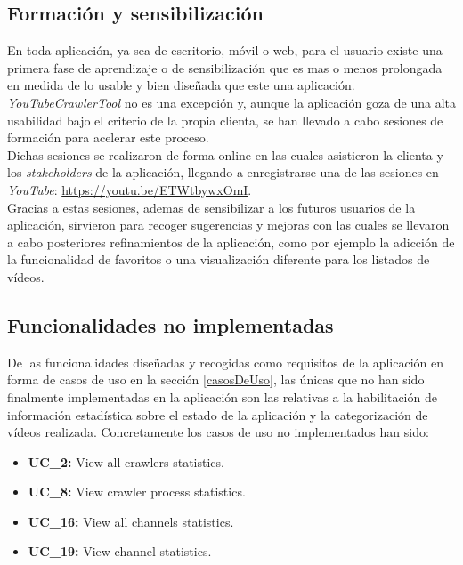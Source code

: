 \documentclass[11pt,a4paper]{article}
\begin{document}
\medskip 

\subsection{Formación y sensibilización}
En toda aplicación, ya sea de escritorio, móvil o web, para el usuario existe una primera fase de aprendizaje o de sensibilización que es mas o menos prolongada en medida de lo usable y bien diseñada que este una aplicación.
\\

\textit{YouTubeCrawlerTool} no es una excepción y, aunque la aplicación goza de una alta usabilidad bajo el criterio de la propia clienta, se han llevado a cabo sesiones de formación para acelerar este proceso.
\\

Dichas sesiones se realizaron de forma online en las cuales asistieron la clienta y los \textit{stakeholders} de la aplicación, llegando a enregistrarse una de las sesiones en \textit{YouTube}: \url{https://youtu.be/ETWtbywxOmI}.
\\

Gracias a estas sesiones, ademas de sensibilizar a los futuros usuarios de la aplicación, sirvieron para recoger sugerencias y mejoras con las cuales se llevaron a cabo posteriores refinamientos de la aplicación, como por ejemplo la adicción de la funcionalidad de favoritos o una visualización diferente para los listados de vídeos.

\medskip 

\subsection{Funcionalidades no implementadas}
De las funcionalidades diseñadas y recogidas como requisitos de la aplicación en forma de casos de uso en la sección \ref{casosDeUso}, las únicas que no han sido finalmente implementadas en la aplicación son las relativas a la habilitación de información estadística sobre el estado de la aplicación y la categorización de vídeos realizada. Concretamente los casos de uso no implementados han sido:

\begin{itemize}
\item \textbf{UC\_2:} View all crawlers statistics.
\item \textbf{UC\_8:} View crawler process statistics.
\item \textbf{UC\_16:} View all channels statistics.
\item \textbf{UC\_19:} View channel statistics.
\end{itemize}
\end{document}
